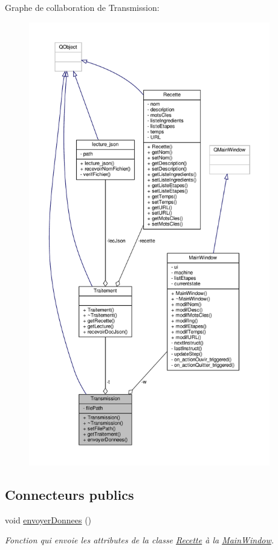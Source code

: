 Graphe de collaboration de Transmission\+:\nopagebreak
\begin{figure}[H]
\begin{center}
\leavevmode
\includegraphics[height=550pt]{classTransmission__coll__graph}
\end{center}
\end{figure}
\subsection*{Connecteurs publics}
\begin{DoxyCompactItemize}
\item 
void \hyperlink{classTransmission_a14b885539e973a158c9c4c25fd99bc04}{envoyer\+Donnees} ()
\begin{DoxyCompactList}\small\item\em Fonction qui envoie les attributes de la classe \hyperlink{classRecette}{Recette} à la \hyperlink{classMainWindow}{Main\+Window}. \end{DoxyCompactList}\end{DoxyCompactItemize}
